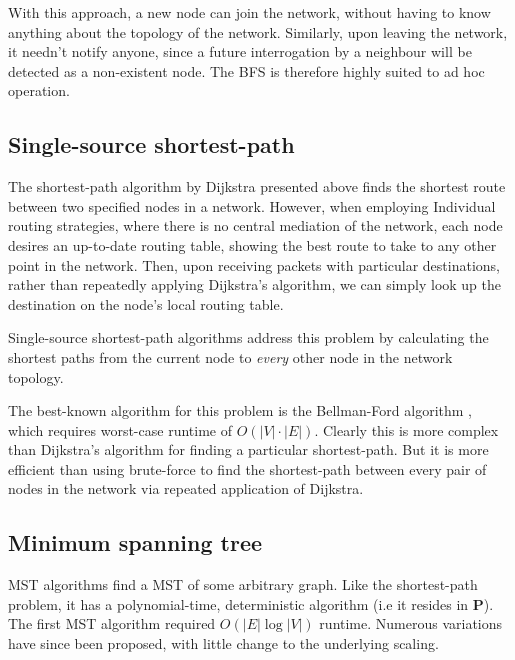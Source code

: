 \documentclass[aps,rmp,twocolumn,amsmath,amssymb,nofootinbib,superscriptaddress,longbibliography,floatfix]{revtex4-1}
\begin{document}
With this approach, a new node can join the network, without having to know anything about the topology of the network. Similarly, upon leaving the network, it needn't notify anyone, since a future interrogation by a neighbour will be detected as a non-existent node. The BFS is therefore highly suited to ad hoc operation.

%
%

\subsection{Single-source shortest-path} \label{sec:single_source_sp}

The shortest-path algorithm by Dijkstra presented above finds the shortest route between two specified nodes in a network. However, when employing {\sc Individual} routing strategies, where there is no central mediation of the network, each node desires an up-to-date routing table, showing the best route to take to any other point in the network. Then, upon receiving packets with particular destinations, rather than repeatedly applying Dijkstra's algorithm, we can simply look up the destination on the node's local routing table.

Single-source shortest-path algorithms address this problem by calculating the shortest paths from the current node to \emph{every} other node in the network topology.

The best-known algorithm for this problem is the Bellman-Ford algorithm \cite{BF}, which requires worst-case runtime of $O(|V|\cdot |E|)$. Clearly this is more complex than Dijkstra's algorithm for finding a particular shortest-path. But it is more efficient than using brute-force to find the shortest-path between every pair of nodes in the network via repeated application of Dijkstra.

%
%

\subsection{Minimum spanning tree} \label{sec:min_tree}

MST algorithms find a MST of some arbitrary graph. Like the shortest-path problem, it has a polynomial-time, deterministic algorithm (i.e it resides in \textbf{P}). The first MST algorithm \cite{bib:Boruvka26} required $O(|E|\log |V|)$ runtime. Numerous variations have since been proposed, with little change to the underlying scaling.
\end{document}
